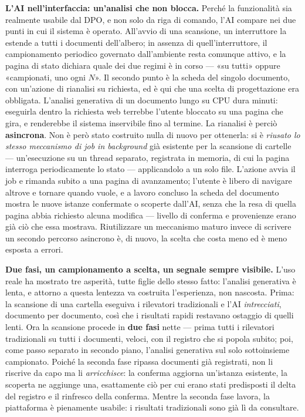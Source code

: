 \textbf{L'AI nell'interfaccia: un'analisi che non blocca.} Perché la funzionalità sia realmente usabile dal DPO, e non solo da riga di comando, l'AI compare nei due punti in cui il sistema è operato. All'avvio di una scansione, un interruttore la estende a tutti i documenti dell'albero; in assenza di quell'interruttore, il campionamento periodico governato dall'ambiente resta comunque attivo, e la pagina di stato dichiara quale dei due regimi è in corso --- «su tutti» oppure «campionati, uno ogni $N$». Il secondo punto è la scheda del singolo documento, con un'azione di rianalisi su richiesta, ed è qui che una scelta di progettazione era obbligata. L'analisi generativa di un documento lungo su CPU dura minuti: eseguirla dentro la richiesta web terrebbe l'utente bloccato su una pagina che gira, e renderebbe il sistema inservibile fino al termine. La rianalisi è perciò \textbf{asincrona}. Non è però stato costruito nulla di nuovo per ottenerla: si è \emph{riusato lo stesso meccanismo di job in background} già esistente per la scansione di cartelle --- un'esecuzione su un thread separato, registrata in memoria, di cui la pagina interroga periodicamente lo stato --- applicandolo a un solo file. L'azione avvia il job e rimanda subito a una pagina di avanzamento; l'utente è libero di navigare altrove e tornare quando vuole, e a lavoro concluso la scheda del documento mostra le nuove istanze confermate o scoperte dall'AI, senza che la resa di quella pagina abbia richiesto alcuna modifica --- livello di conferma e provenienze erano già ciò che essa mostrava. Riutilizzare un meccanismo maturo invece di scrivere un secondo percorso asincrono è, di nuovo, la scelta che costa meno ed è meno esposta a errori. \medskip

\textbf{Due fasi, un campionamento a scelta, un segnale sempre visibile.} L'uso reale ha mostrato tre asperità, tutte figlie dello stesso fatto: l'analisi generativa è lenta, e attorno a questa lentezza va costruita l'esperienza, non nascosta. Prima: la scansione di una cartella eseguiva i rilevatori tradizionali e l'AI \emph{intrecciati}, documento per documento, così che i risultati rapidi restavano ostaggio di quelli lenti. Ora la scansione procede in \textbf{due fasi} nette --- prima tutti i rilevatori tradizionali su tutti i documenti, veloci, con il registro che si popola subito; poi, come passo separato in secondo piano, l'analisi generativa sul solo sottoinsieme campionato. Poiché la seconda fase ripassa documenti già registrati, non li riscrive da capo ma li \emph{arricchisce}: la conferma aggiorna un'istanza esistente, la scoperta ne aggiunge una, esattamente ciò per cui erano stati predisposti il delta del registro e il rinfresco della conferma. Mentre la seconda fase lavora, la piattaforma è pienamente usabile: i risultati tradizionali sono già lì da consultare. \medskip

